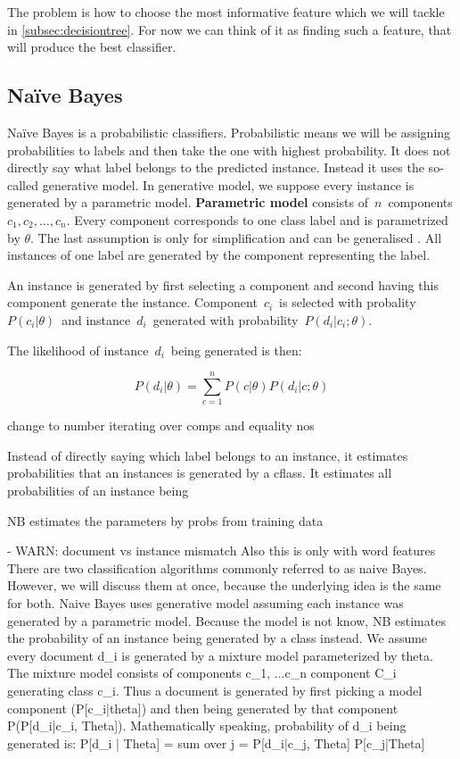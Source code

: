 The problem is how to choose the most informative feature which we will tackle in \autoref{subsec:decisiontree}.
For now we can think of it as finding such a feature, that will produce the best classifier.

\subsection{Na\"{i}ve Bayes}

Na\"{i}ve Bayes is a probabilistic classifiers.
Probabilistic means we will be assigning probabilities to labels and then take the one with highest probability.
It does not directly say what label belongs to the predicted instance.
Instead it uses the so-called generative model.
In generative model, we suppose every instance is generated by a parametric model.
\textbf{Parametric model} consists of~$n$~components $c_1, c_2,\ldots, c_n$.
Every component corresponds to one class label and is parametrized by $\theta$.
The last assumption is only for simplification and can be generalised .
All instances of one label are generated by the component representing the label.

An instance is generated by first selecting a component and second having this component
generate the instance.
Component~$c_i$~is selected with probality~$P\left(c_i|\theta\right)$~and 
instance~$d_i$~generated with probability~$P\left(d_i|c_i;\theta\right)$.

The likelihood of instance~$d_i$~being generated is then:

\begin{equation}
	P\left(d_i|\theta\right) = \sum_{c=1}^{n}{
	P\left(c|\theta\right)
	P\left(d_i|c;\theta\right)
}
\end{equation}

change to number iterating over comps and equality nos


Instead of directly saying which label belongs to an instance,
it estimates probabilities that an instances is generated by a cflass.
It estimates all probabilities of an instance being 

NB estimates the parameters by probs from training data




- WARN: document vs instance mismatch
Also this is only with word features
There are two classification algorithms commonly referred to as naive Bayes. However, we will discuss them at once, because the underlying idea is the same for both.
Naive Bayes uses generative model assuming each instance was generated by a parametric model. Because the model is not know, NB estimates the probability of an instance being generated by a class instead. We assume every document d\_i is generated by a mixture model parameterized by theta. The mixture model consists of components {c\_1, ...c\_n} component C\_i generating class c\_i. Thus a document is generated by first picking a model component (P[c\_i|theta]) and then being generated by that component P(P[d\_i|c\_i, Theta]).
Mathematically speaking, probability of d\_i being generated is:
P[d\_i | Theta] = sum over j = P[d\_i|c\_j, Theta] P[c\_j|Theta]


